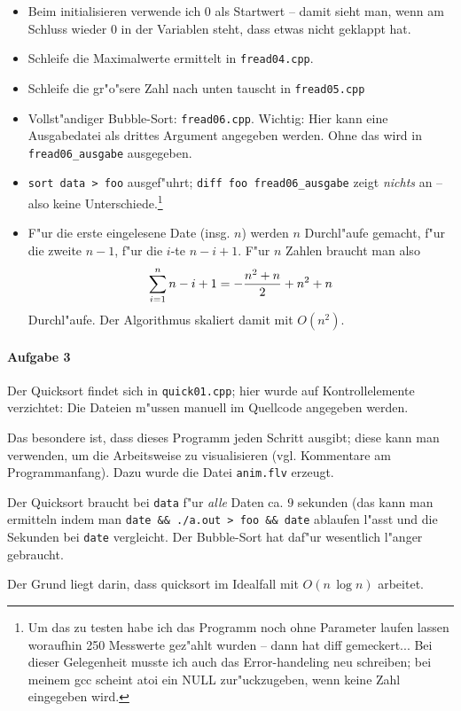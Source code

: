 \documentclass[a4paper,12pt,draft]{article}
\begin{document}
\begin{itemize}
\item Beim initialisieren verwende ich 0 als Startwert -- damit sieht
  man, wenn am Schluss wieder 0 in der Variablen steht, dass etwas
  nicht geklappt hat.
\item Schleife die Maximalwerte ermittelt in \verb+fread04.cpp+.
\item Schleife die gr"o"sere Zahl nach unten tauscht in \verb+fread05.cpp+
\item Vollst"andiger Bubble-Sort: \verb+fread06.cpp+. Wichtig: Hier
  kann eine Ausgabedatei als drittes Argument angegeben werden. Ohne
  das wird in \verb+fread06_ausgabe+ ausgegeben.
\item \verb+sort data > foo+ ausgef"uhrt;  
\verb+diff foo fread06_ausgabe+ zeigt \emph{nichts} an -- also keine
  Unterschiede.\footnote{Um das zu testen habe ich das Programm noch
    ohne Parameter laufen lassen woraufhin 250 Messwerte gez"ahlt
    wurden -- dann hat diff gemeckert... Bei dieser Gelegenheit
  musste ich auch das Error-handeling neu schreiben; bei meinem
  gcc scheint atoi ein NULL zur"uckzugeben, wenn
  keine Zahl eingegeben wird.}
\item F"ur die erste eingelesene Date (insg. $n$) werden $n$
  Durchl"aufe gemacht, f"ur die zweite $n-1$, f"ur die $i$-te
  $n-i+1$. F"ur $n$ Zahlen braucht man also
  \begin{equation}
    \label{eq:1}
    \sum_{i=1}^n n-i+1 = -{{n^2+n}\over{2}}+n^2+n 
  \end{equation}
  Durchl"aufe. Der Algorithmus skaliert damit mit $O(n^2)$.
\end{itemize}

 
 

\paragraph{Aufgabe 3}
\label{sec:aufgabe_3}

Der Quicksort findet sich in \verb+quick01.cpp+; hier wurde auf
Kontrollelemente verzichtet: Die Dateien m"ussen manuell im Quellcode
angegeben werden.

Das besondere ist, dass dieses Programm jeden Schritt ausgibt; diese
kann man verwenden, um die Arbeitsweise zu visualisieren
(vgl. Kommentare am Programmanfang). Dazu wurde die Datei
\verb+anim.flv+ erzeugt.

Der Quicksort braucht bei \verb+data+ f"ur \emph{alle} Daten ca. $9$
sekunden (das kann man ermitteln indem man
\verb+date && ./a.out > foo && date+
ablaufen l"asst und die Sekunden bei \verb+date+ vergleicht. Der
Bubble-Sort hat daf"ur wesentlich l"anger gebraucht.

Der Grund liegt darin, dass quicksort im Idealfall mit $O(n \, \log
n)$ arbeitet.
 
 
 
 
 
 
\end{document}
